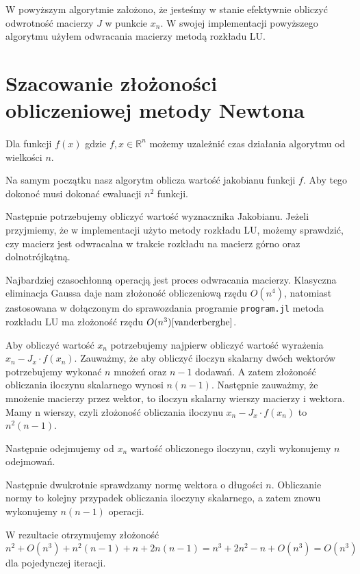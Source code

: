 \documentclass{article}
\begin{document}
    W powyższym algorytmie założono, że jesteśmy w stanie efektywnie obliczyć odwrotność
    macierzy $J$ w punkcie $x_n$. W swojej implementacji powyższego algorytmu
    użyłem odwracania macierzy metodą rozkładu LU.
  \section{Szacowanie złożoności obliczeniowej metody Newtona}
    \paragraph{} Dla funkcji $f(x)$ gdzie $f, x \in \mathbb{R}^n$ możemy uzależnić
    czas działania algorytmu od wielkości $n$.

    Na samym początku nasz algorytm oblicza wartość jakobianu funkcji $f$. Aby
    tego dokonoć musi dokonać ewaluacji $n^2$ funkcji.

    Następnie potrzebujemy obliczyć wartość wyznacznika Jakobianu. Jeżeli przyjmiemy,
    że w implementacji użyto metody rozkładu LU, możemy sprawdzić, czy macierz
    jest odwracalna w trakcie rozkładu na macierz górno oraz dolnotrójkątną.

    Najbardziej czasochłonną operacją jest proces odwracania macierzy. Klasyczna
    eliminacja Gaussa daje nam złożoność obliczeniową rzędu $O(n^4)$\cite{vanderberghe}, natomiast
    zastosowana w dołączonym do sprawozdania programie \texttt{program.jl} metoda
    rozkładu LU ma złożoność rzędu $O(n^3) \cite{vanderberghe}$.

    Aby obliczyć wartość $x_n$ potrzebujemy najpierw obliczyć wartość wyrażenia
    $x_n-J_{x}\cdot f(x_n)$. Zauważmy, że aby obliczyć iloczyn skalarny dwóch
    wektorów potrzebujemy wykonać $n$ mnożeń oraz $n-1$ dodawań. A zatem złożoność obliczania
    iloczynu skalarnego wynosi $n(n-1)$. Następnie zauważmy, że mnożenie macierzy
    przez wektor, to iloczyn skalarny wierszy macierzy i wektora. Mamy n wierszy, czyli
    złożoność obliczania iloczynu $x_n-J_{x}\cdot f(x_n)$ to $n^2(n-1)$.

    Następnie odejmujemy od $x_n$ wartość obliczonego iloczynu, czyli wykonujemy
    $n$ odejmowań.

    Następnie dwukrotnie sprawdzamy normę wektora o długości $n$. Obliczanie normy
    to kolejny przypadek obliczania iloczyny skalarnego, a zatem znowu wykonujemy
    $n(n-1)$ operacji.

    W rezultacie otrzymujemy złożoność $n^2 + O(n^3) + n^2(n-1) + n + 2n(n-1) = n^3 +2n^2 - n + O(n^3) = O(n^3)$
    dla pojedynczej iteracji.
\end{document}
